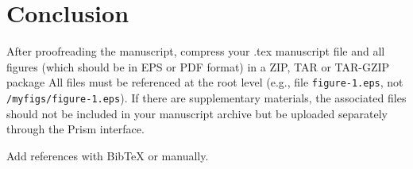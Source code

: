 \documentclass{osa-article}
\begin{document}
\section{Conclusion}
After proofreading the manuscript, compress your .tex manuscript file and all figures (which should be in EPS or PDF format) in a ZIP, TAR or TAR-GZIP package
All files must be referenced at the root level (e.g., file \texttt{figure-1.eps}, not \texttt{/myfigs/figure-1.eps}). If there are supplementary materials, the associated files should not be included in your manuscript archive but be uploaded separately through the Prism interface.


Add references with BibTeX or manually.
\cite{Zhang:14,OSA,FORSTER2007,Dean2006,testthesis,Yelin:03,Masajada:13,codeexample}







\end{document}
